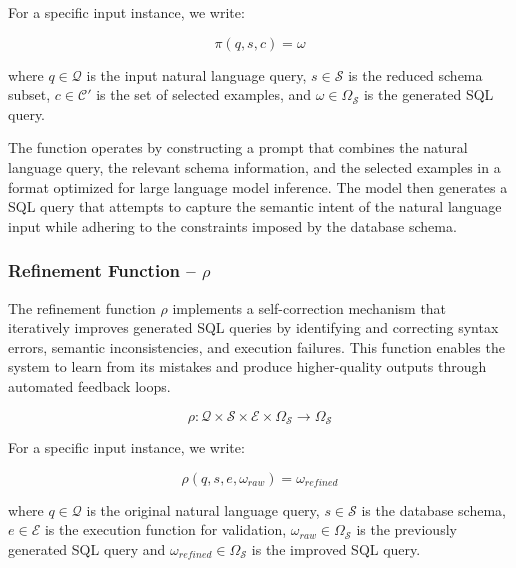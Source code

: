 \vspace{0.5em}

For a specific input instance, we write:

$$
\pi(q, s, c) = \omega
$$

\vspace{0.5em}

where $q \in \mathcal{Q}$ is the input natural language query, $s \in \mathcal{S}$ is
the reduced schema subset, $c \in \mathcal{C}'$ is the set of selected examples,
and $\omega \in \Omega_{\mathcal{S}}$ is the generated SQL query.

The function operates by constructing a prompt that combines the natural language
query, the relevant schema information, and the selected examples in a format
optimized for large language model inference. The model then generates a SQL query
that attempts to capture the semantic intent of the natural language input while
adhering to the constraints imposed by the database schema.

\subsubsection{Refinement Function – $\rho$}\label{design:refinement-function}

The refinement function $\rho$ implements a self-correction mechanism that iteratively
improves generated SQL queries by identifying and correcting syntax errors,
semantic inconsistencies, and execution failures. This function enables the system
to learn from its mistakes and produce higher-quality outputs through automated
feedback loops.

$$
\rho: \mathcal{Q} \times \mathcal{S} \times \mathcal{E} \times \Omega_{\mathcal{S}} \rightarrow \Omega_{\mathcal{S}}
$$

\vspace{0.5em}

For a specific input instance, we write:

$$
\rho(q, s, e, \omega_{raw}) = \omega_{refined}
$$

\vspace{0.5em}

where $q \in \mathcal{Q}$ is the original natural language query, $s \in \mathcal{S}$
is the database schema, $e \in \mathcal{E}$ is the execution function for
validation, $\omega_{raw} \in \Omega_{\mathcal{S}}$ is the previously generated SQL
query and $\omega_{refined} \in \Omega_{\mathcal{S}}$ is the improved SQL query.


